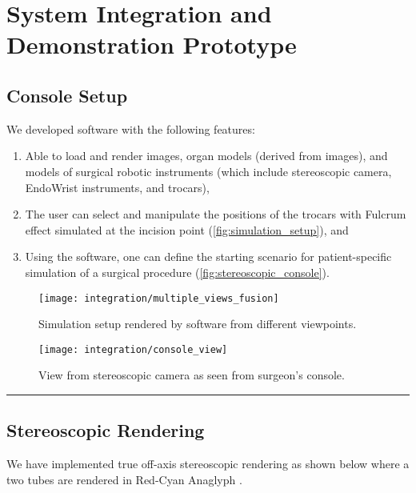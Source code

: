 
\section{System Integration and Demonstration Prototype}\label{sec:system_integration}

\subsection{Console Setup}\label{ssec:console_setup}
We developed software with the following features:
\begin{enumerate}
  \item Able to load and render   images, organ models (derived from  images), and  models of surgical robotic instruments (which include stereoscopic camera, EndoWrist instruments, and trocars),
  \item The user can select and manipulate the positions of the trocars with Fulcrum effect simulated at the incision point (\autoref{fig:simulation_setup}), and
  \item Using the software, one can define the starting scenario for patient-specific simulation of a surgical procedure (\autoref{fig:stereoscopic_console}).
\end{enumerate}

\begin{figure}
  \centering%
  \texttt{[image: integration/multiple\_views\_fusion]}
  \caption{Simulation setup rendered by software from different viewpoints.}\label{fig:simulation_setup}
\end{figure}

\begin{figure}
  \centering%
  \texttt{[image: integration/console\_view]}
  \caption{View from stereoscopic camera as seen from surgeon’s console.}\label{fig:stereoscopic_console}
\end{figure}

\hrule%

\subsection{Stereoscopic Rendering}\label{ssec:stereo_rendering}

We have implemented true off-axis stereoscopic rendering as shown below where a two tubes are rendered in Red-Cyan Anaglyph .

